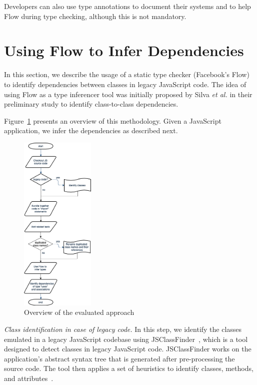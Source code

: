 \documentclass[review]{elsarticle}
\begin{document}
Developers can also use type annotations to document their systems and to help Flow during type checking, although this is not mandatory.


\section{Using Flow to Infer Dependencies}
\label{sec:approach}

In this section, we describe the usage of a static type checker (Facebook's Flow) to identify dependencies between classes in legacy JavaScript code. The idea of using Flow as a type inferencer tool was initially proposed by Silva \emph{et al.} \cite{sanerera2017} in their preliminary study to identify class-to-class dependencies. 

Figure~\ref{fig:proposed-approach} presents an overview of this methodology. Given a JavaScript application, we infer the dependencies as described next.

\begin{figure}[ht]
	\centering
	\captionsetup{justification=centering}
	\includegraphics[width=1.4in]{fig/flowchart_draw-io.png}
	\caption{Overview of the evaluated approach}
	\label{fig:proposed-approach}
\end{figure}


\noindent \textit{Class identification in case of legacy code.} In this step, we identify the classes emulated in a legacy JavaScript codebase using JSClassFinder~\cite{silva-cbsoft2015}, which is a tool designed to detect classes in legacy JavaScript code. JSClassFinder works on the application's abstract syntax tree that is generated after pre-processing the source code. The tool then applies a set of heuristics to identify classes, methods, and attributes~\cite{leonardo-jsep2017}. 
\end{document}
